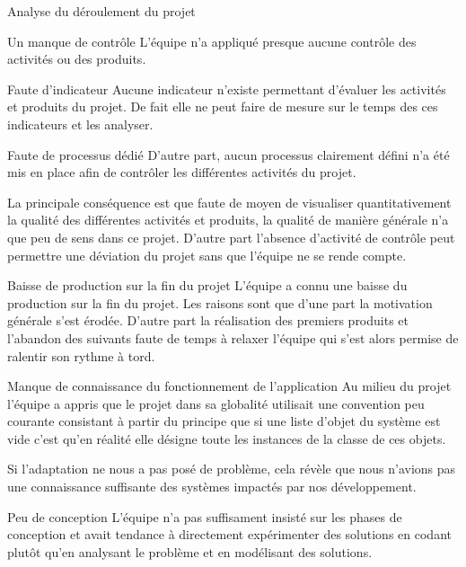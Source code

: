 \documentclass[]{article}
\begin{document}
{\begin{section}{Analyse du déroulement du projet}
 \begin{subsection}{Un manque de contrôle}
     L'équipe n'a appliqué presque aucune contrôle des activités ou des produits.
     \begin{subsubsection}{Faute d'indicateur}
         Aucune indicateur n'existe permettant d'évaluer les activités et produits du projet. De fait elle ne peut faire de mesure sur le temps des ces indicateurs et les analyser.
     \end{subsubsection}

     \begin{subsubsection}{Faute de processus dédié}
         D'autre part, aucun processus clairement défini n'a été mis en place afin de contrôler les différentes activités du projet.
     \end{subsubsection}

     La principale conséquence est que faute de moyen de visualiser quantitativement la qualité des différentes activités et produits, la qualité de manière générale n'a que peu de sens dans ce projet. D'autre part l'absence d'activité de contrôle peut permettre une déviation du projet sans que l'équipe ne se rende compte.
 \end{subsection}

 \begin{subsection}{Baisse de production sur la fin du projet}
     L'équipe a connu une baisse du production sur la fin du projet. Les raisons sont que d'une part la motivation générale s'est érodée. D'autre part la réalisation des premiers produits et l'abandon des suivants faute de temps à relaxer l'équipe qui s'est alors permise de ralentir son rythme à tord.
 \end{subsection}

 \begin{subsection}{Manque de connaissance du fonctionnement de l'application}
     Au milieu du projet l'équipe a appris que le projet dans sa globalité utilisait une convention peu courante consistant à partir du principe que si une liste d'objet du système est vide c'est qu'en réalité elle désigne toute les instances de la classe de ces objets.

     Si l'adaptation ne nous a pas posé de problème, cela révèle que nous n'avions pas une connaissance suffisante des systèmes impactés par nos développement.
 \end{subsection}

 \begin{subsection}{Peu de conception}
     L'équipe n'a pas suffisament insisté sur les phases de conception et avait tendance à directement expérimenter des solutions en codant plutôt qu'en analysant le problème et en modélisant des solutions.


\end{subsection}
\end{section}}
\end{document}
